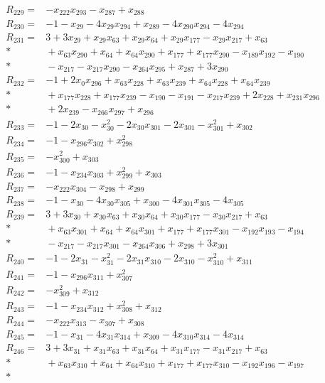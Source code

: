 \begin{align*}
R_{229}={}&-x_{222}x_{293}-x_{287}+x_{288}\\[3pt]
R_{230}={}&-1-x_{29}-4x_{29}x_{294}+x_{289}-4x_{290}x_{294}-4x_{294}\\[3pt]
R_{231}={}&3+3x_{29}+x_{29}x_{63}+x_{29}x_{64}+x_{29}x_{177}-x_{29}x_{217}+x_{63}\\*
&{}+x_{63}x_{290}+x_{64}+x_{64}x_{290}+x_{177}+x_{177}x_{290}-x_{189}x_{192}-x_{190}\\*
&{}-x_{217}-x_{217}x_{290}-x_{264}x_{295}+x_{287}+3x_{290}\\[3pt]
R_{232}={}&-1+2x_{0}x_{296}+x_{63}x_{228}+x_{63}x_{239}+x_{64}x_{228}+x_{64}x_{239}\\*
&{}+x_{177}x_{228}+x_{177}x_{239}-x_{190}-x_{191}-x_{217}x_{239}+2x_{228}+x_{231}x_{296}\\*
&{}+2x_{239}-x_{266}x_{297}+x_{296}\\[3pt]
R_{233}={}&-1-2x_{30}-x_{30}^{2}-2x_{30}x_{301}-2x_{301}-x_{301}^{2}+x_{302}\\[3pt]
R_{234}={}&-1-x_{296}x_{302}+x_{298}^{2}\\[3pt]
R_{235}={}&-x_{300}^{2}+x_{303}\\[3pt]
R_{236}={}&-1-x_{234}x_{303}+x_{299}^{2}+x_{303}\\[3pt]
R_{237}={}&-x_{222}x_{304}-x_{298}+x_{299}\\[3pt]
R_{238}={}&-1-x_{30}-4x_{30}x_{305}+x_{300}-4x_{301}x_{305}-4x_{305}\\[3pt]
R_{239}={}&3+3x_{30}+x_{30}x_{63}+x_{30}x_{64}+x_{30}x_{177}-x_{30}x_{217}+x_{63}\\*
&{}+x_{63}x_{301}+x_{64}+x_{64}x_{301}+x_{177}+x_{177}x_{301}-x_{192}x_{193}-x_{194}\\*
&{}-x_{217}-x_{217}x_{301}-x_{264}x_{306}+x_{298}+3x_{301}\\[3pt]
R_{240}={}&-1-2x_{31}-x_{31}^{2}-2x_{31}x_{310}-2x_{310}-x_{310}^{2}+x_{311}\\[3pt]
R_{241}={}&-1-x_{296}x_{311}+x_{307}^{2}\\[3pt]
R_{242}={}&-x_{309}^{2}+x_{312}\\[3pt]
R_{243}={}&-1-x_{234}x_{312}+x_{308}^{2}+x_{312}\\[3pt]
R_{244}={}&-x_{222}x_{313}-x_{307}+x_{308}\\[3pt]
R_{245}={}&-1-x_{31}-4x_{31}x_{314}+x_{309}-4x_{310}x_{314}-4x_{314}\\[3pt]
R_{246}={}&3+3x_{31}+x_{31}x_{63}+x_{31}x_{64}+x_{31}x_{177}-x_{31}x_{217}+x_{63}\\*
&{}+x_{63}x_{310}+x_{64}+x_{64}x_{310}+x_{177}+x_{177}x_{310}-x_{192}x_{196}-x_{197}\\*

\end{align*}

